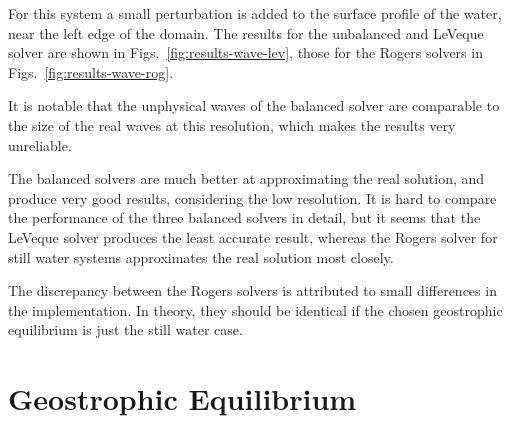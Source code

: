 For this system a small perturbation is added to the surface profile of the water, near the left edge of the domain. The results for the unbalanced and LeVeque solver are shown in Figs.~\ref{fig:results-wave-lev}, those for the Rogers solvers in Figs.~\ref{fig:results-wave-rog}.

It is notable that the unphysical waves of the balanced solver are comparable to the size of the real waves at this resolution, which makes the results very unreliable.

The balanced solvers are much better at approximating the real solution, and produce very good results, considering the low resolution. It is hard to compare the performance of the three balanced solvers in detail, but it seems that the LeVeque solver produces the least accurate result, whereas the Rogers solver for still water systems approximates the real solution most closely.

The discrepancy between the Rogers solvers is attributed to small differences in the implementation. In theory, they should be identical if the chosen geostrophic equilibrium is just the still water case.

\section{Geostrophic Equilibrium}
\label{sec:results-geo}

